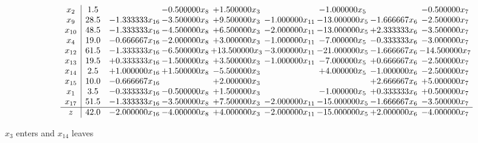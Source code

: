 \documentclass[10pt]{article}
\begin{document}
 \[\begin{array}{c| c c@{\hskip 2pt} c@{\hskip 2pt} c@{\hskip 2pt} c@{\hskip 2pt} c@{\hskip 2pt} c@{\hskip 2pt} c@{\hskip 2pt} }
 x_{2}   &  1.5  &   & -0.500000 x_{8} & + 1.500000 x_{3} &   & -1.000000 x_{5} &   & -0.500000 x_{7}\\
 x_{9}   &  28.5 & -1.333333 x_{16} & -3.500000 x_{8} & + 9.500000 x_{3} & -1.000000 x_{11} & -13.000000 x_{5} & -1.666667 x_{6} & -2.500000 x_{7}\\
 x_{10}   &  48.5 & -1.333333 x_{16} & -4.500000 x_{8} & + 6.500000 x_{3} & -2.000000 x_{11} & -13.000000 x_{5} & + 2.333333 x_{6} & -3.500000 x_{7}\\
 x_{4}   &  19.0 & -0.666667 x_{16} & -2.000000 x_{8} & + 3.000000 x_{3} & -1.000000 x_{11} & -7.000000 x_{5} & -0.333333 x_{6} & -3.000000 x_{7}\\
 x_{12}   &  61.5 & -1.333333 x_{16} & -6.500000 x_{8} & + 13.500000 x_{3} & -3.000000 x_{11} & -21.000000 x_{5} & -1.666667 x_{6} & -14.500000 x_{7}\\
 x_{13}   &  19.5 & + 0.333333 x_{16} & -1.500000 x_{8} & + 3.500000 x_{3} & -1.000000 x_{11} & -7.000000 x_{5} & + 0.666667 x_{6} & -2.500000 x_{7}\\
 x_{14}   &  2.5 & + 1.000000 x_{16} & + 1.500000 x_{8} & -5.500000 x_{3} &   & + 4.000000 x_{5} & -1.000000 x_{6} & -2.500000 x_{7}\\
 x_{15}   &  10.0 & -0.666667 x_{16} &   & + 2.000000 x_{3} &    &   & + 2.666667 x_{6} & + 5.000000 x_{7}\\
 x_{1}   &  3.5 & -0.333333 x_{16} & -0.500000 x_{8} & + 1.500000 x_{3} &   & -1.000000 x_{5} & + 0.333333 x_{6} & + 0.500000 x_{7}\\
 x_{17}   &  51.5 & -1.333333 x_{16} & -3.500000 x_{8} & + 7.500000 x_{3} & -2.000000 x_{11} & -15.000000 x_{5} & -1.666667 x_{6} & -3.500000 x_{7}\\
\hline
z    &  42.0 & -2.000000 x_{16} & -4.000000 x_{8} & + 4.000000 x_{3} & -2.000000 x_{11} & -15.000000 x_{5} & + 2.000000 x_{6} & -4.000000 x_{7}\\
\end{array}\]


 $ x_{3} $ enters and $ x_{14} $ leaves 
\end{document}
